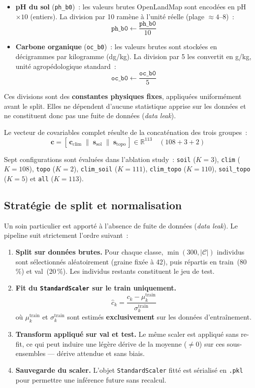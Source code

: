 \begin{itemize}
    \item \textbf{pH du sol} (\texttt{ph\_b0})~: les valeurs brutes OpenLandMap
    sont encodées en pH $\times 10$ (entiers). La division par 10 ramène à l'unité
    réelle (plage $\approx 4$--$8$)~:
    \[
        \texttt{ph\_b0} \leftarrow \frac{\texttt{ph\_b0}}{10}
    \]
    \item \textbf{Carbone organique} (\texttt{oc\_b0})~: les valeurs brutes sont
    stockées en décigrammes par kilogramme (dg/kg). La division par 5 les convertit
    en g/kg, unité agropédologique standard~:
    \[
        \texttt{oc\_b0} \leftarrow \frac{\texttt{oc\_b0}}{5}
    \]
\end{itemize}

Ces divisions sont des \textbf{constantes physiques fixes}, appliquées uniformément
avant le split. Elles ne dépendent d'aucune statistique apprise sur les données et
ne constituent donc pas une fuite de données (\textit{data leak}).

Le vecteur de covariables complet résulte de la concaténation des trois groupes~:
\[
    \mathbf{c} = \left[\,\mathbf{c}_{\text{clim}} \;\|\; \mathbf{s}_{\text{sol}}
    \;\|\; \mathbf{s}_{\text{topo}}\,\right] \in \mathbb{R}^{113}
    \quad (108 + 3 + 2)
\]

Sept configurations sont évaluées dans l'ablation study~: \texttt{soil} ($K=3$),
\texttt{clim} ($K=108$), \texttt{topo} ($K=2$), \texttt{clim\_soil} ($K=111$),
\texttt{clim\_topo} ($K=110$), \texttt{soil\_topo} ($K=5$) et \texttt{all} ($K=113$).

\subsection{Stratégie de split et normalisation}
\label{sec:split_norm}

Un soin particulier est apporté à l'absence de fuite de données (\textit{data leak}).
Le pipeline suit strictement l'ordre suivant~:

\begin{enumerate}
    \item \textbf{Split sur données brutes.} Pour chaque classe,
    $\min(300, |\mathcal{C}|)$ individus sont sélectionnés aléatoirement (graine fixée
    à 42), puis répartis en train~(80\,\%) et val~(20\,\%). Les individus restants
    constituent le jeu de test.
    \item \textbf{Fit du \texttt{StandardScaler} sur le train uniquement.}
    \[
        \hat{c}_k = \frac{c_k - \mu_k^{\text{train}}}{\sigma_k^{\text{train}}}
    \]
    où $\mu_k^{\text{train}}$ et $\sigma_k^{\text{train}}$ sont estimés
    \textbf{exclusivement} sur les données d'entraînement.
    \item \textbf{Transform appliqué sur val et test.} Le même scaler est appliqué
    sans re-fit, ce qui peut induire une légère dérive de la moyenne ($\neq 0$) sur
    ces sous-ensembles — dérive attendue et sans biais.
    \item \textbf{Sauvegarde du scaler.} L'objet \texttt{StandardScaler} fitté est
    sérialisé en \texttt{.pkl} pour permettre une inférence future sans recalcul.
\end{enumerate}


